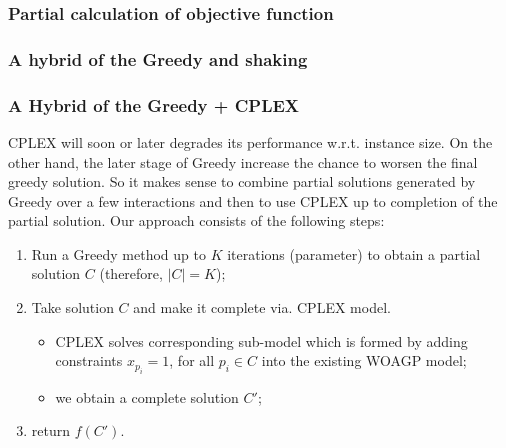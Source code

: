 \documentclass[runningheads,a4paper]{elsarticle}
\begin{document}
     \subsubsection{Partial calculation of objective function}

    \subsubsection{A hybrid of the Greedy and shaking}
    
    
    \subsubsection{A Hybrid of the Greedy + CPLEX}
        CPLEX will soon or later degrades its performance w.r.t. instance size. On the other hand, the later stage of Greedy increase the chance to worsen the final greedy solution.  So it makes sense to combine  partial solutions generated by  Greedy over a few interactions  and then to use CPLEX up to completion of the partial solution. Our approach consists of the following steps:
        \begin{enumerate}
        	\item Run a Greedy method up to $K$ iterations (parameter) to obtain a partial solution $C$ (therefore, $|C| = K$);
        	\item Take solution $C$ and make it complete via. CPLEX model.
        	\begin{itemize}
        		\item CPLEX solves corresponding sub-model which is formed by adding constraints $x_{p_i} = 1$, for all $p_i \in C$ into the existing WOAGP model;
        		\item we obtain a complete solution $C'$;
        	\end{itemize}
            \item return $f(C')$.
        \end{enumerate}

      \begin{comment}

       \noindent \textbf{Improvements of the above method.} The above method can serve as a basic iteration
       of a more advanced techniques like ILP-LNS or CMSA. In this case, methods for destructing the solutions
       has to be proposed.  Underlying idea could be:
       \begin{itemize}
       	    \item remove $N$ guards with the largest costs out of $C'$
       	    \item remove $N$ guards which have a higher amount of points from $D(P)$ covered by other guards, represented by the function
       	    \begin{align}
       	       ratio(i) = \frac{\sum_{v \in V\setminus{ \{i\}}, j \in V(i)} 1_{j \mbox{ is veasible from } v} }{|V(i)|}.
       	    \end{align}
       \end{itemize}
      \end{comment}
\end{document}
